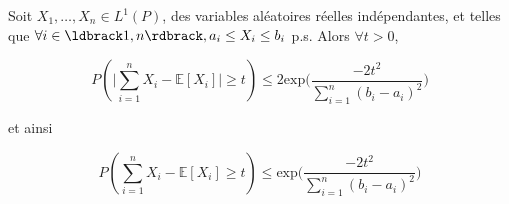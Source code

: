 \documentclass[12pt]{article}
\newif\ifcorrection
\newcommand{\corr}[1]{\ifcorrection{\color{lightblue}#1\color{black}}\fi}
\newcommand{\espace}{\vspace{1.5em}}
\newcommand{\petitespace}{\vspace{0.5cm}}
\newcommand{\bb}[1]{\mathbb{#1}} %
\newcommand{\somme}[2]{\sum\limits_{#1}^{#2}}
\newcommand{\produit}[2]{\mathop{\Pi}\limits_{#1}^{#2}}
\newcommand{\Xunan}{X_1,\ldots,X_n} %
\newcommand{\esp}[1]{\bb{ E} \mathopen{}\left[#1\right]} %
\newcommand{\1}{\bb{1}} %
\begin{document}
Soit $\Xunan\in L^1( P)$, des variables aléatoires réelles indépendantes, et telles que $\forall i \in \ldbrack 1,n\rdbrack, a_i \le X_i \le b_i$ p.s. Alors $\forall t > 0$,

$$P(\lvert \somme{i=1}{n} X_i-\esp{X_i}\rvert \ge t) \le 2\text{exp}\big(\frac{-2t^2}{\somme{i=1}{n}(b_i-a_i)^2}\big)$$

et ainsi 

$$ P(\somme{i=1}{n}X_i-\esp{X_i}\ge t)\le\text{exp}\big(\frac{-2t^2}{\somme{i=1}{n}(b_i-a_i)^2}\big) $$\petitespace

\corr{\textbf{Preuve :}\petitespace

On pose $Y_i = X_i - \esp{X_i}$, les $Y_i$ sont donc centrées, et sont entre $a_i-\esp{X_i}$ et $b_i-\esp{X_i}$ presque surement. 

On pose  $S_n = \somme{i=1}{n}Y_i$, on a pour tout $x \ge 0, u>0$, par Markov :

\begin{align*}
	P(S_n-\esp{S_n} \ge x)&=P(e^{u(S_n-\esp{S_n})} \ge e^{ux})\\
	&\le \frac{\esp{e^{u(S_n-\esp{S_n})}}}{e^{ux}} \text{ (Markov)}\\
	&\le e^{-ux} \produit{i=1}{n}\esp{e^{uY_i}}
\end{align*}

On obtient par le lemme précédent, car $b_i-a_i = b_i-\esp{X_i}-(a_i-\esp{X_i})$

$$P(S_n-\esp{S_n} \ge x) \le e^{-ux + \frac{u^2}{8} \somme{i=1}{n}(b_i-a_i)^2} $$

Sachant que c'est pour tout $u >0$, on optimise et on trouve $u = \frac{4x}{ \somme{i=1}{n}(b_i-a_i)^2}$

Ce qui montre que 

\begin{align*}
	P(S_n-\esp{S_n} \ge x)&=P(e^{u(S_n-\esp{S_n})}) \le e^{- \frac{4x}{ \somme{i=1}{n}(b_i-a_i)^2}x + \frac{2x^2}{\somme{i=1}{n}(b_i-a_i)^2}}\\
	& = e^{-\frac{2x^2}{\somme{i=1}{n}(b_i-a_i)^2}}
\end{align*}

En remplaçant $X_i$ par $-X_i$ on obtient aussi 

$$ P(S_n-\esp{S_n} \le -x) \le e^{-\frac{2x^2}{\somme{i=1}{n}(b_i-a_i)^2}}$$

et donc $\forall x>0$, on a 

$$P(\lvert \somme{i=1}{n} X_i-\esp{X_i}\rvert \ge x) \le 2\text{exp}(-\frac{2x^2}{\somme{i=1}{n}(b_i-a_i)^2})$$

\espace}
\end{document}

